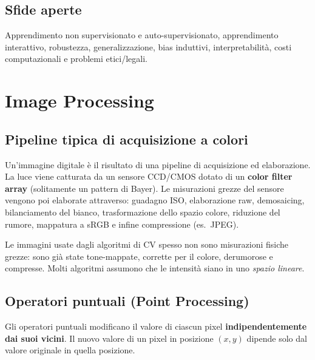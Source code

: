 \documentclass[12pt, a4paper]{report}
\begin{document}
\section{Sfide aperte}

Apprendimento non supervisionato e auto-supervisionato, apprendimento interattivo,
robustezza, generalizzazione, bias induttivi, interpretabilità, costi computazionali
e problemi etici/legali.

\chapter{Image Processing}

\section{Pipeline tipica di acquisizione a colori}

Un'immagine digitale è il risultato di una pipeline di acquisizione ed elaborazione.
La luce viene catturata da un sensore CCD/CMOS dotato di un \textbf{color filter
array} (solitamente un pattern di Bayer).  Le misurazioni grezze del sensore vengono
poi elaborate attraverso: guadagno ISO, elaborazione raw, demosaicing, bilanciamento
del bianco, trasformazione dello spazio colore, riduzione del rumore, mappatura a
sRGB e infine compressione (es.\ JPEG).

\begin{notebox}
Le immagini usate dagli algoritmi di CV spesso non sono misurazioni fisiche grezze:
sono già state tone-mappate, corrette per il colore, derumorose e compresse.  Molti
algoritmi assumono che le intensità siano in uno \emph{spazio lineare}.
\end{notebox}

\section{Operatori puntuali (Point Processing)}

\begin{defbox}
Gli operatori puntuali modificano il valore di ciascun pixel \textbf{indipendentemente
dai suoi vicini}.  Il nuovo valore di un pixel in posizione $(x,y)$ dipende solo dal
valore originale in quella posizione.
\end{defbox}
\end{document}
